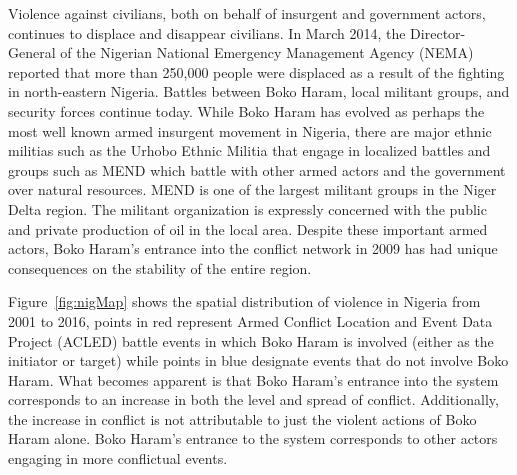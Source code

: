 Violence against civilians, both on behalf of insurgent and government actors, continues to displace and disappear civilians.  In March 2014, the Director-General of the Nigerian National Emergency Management Agency (NEMA) reported that more than 250,000 people were displaced as a result of the fighting in north-eastern Nigeria. Battles between Boko Haram, local militant groups, and security forces continue today. While Boko Haram has evolved as perhaps the most well known armed insurgent movement in Nigeria, there are major ethnic militias such as the Urhobo Ethnic Militia that engage in localized battles and groups such as MEND which battle with other armed actors and the government over natural resources. MEND is one of the largest militant groups in the Niger Delta region. The militant organization is expressly concerned with the public and private production of oil in the local area. Despite these important armed actors, Boko Haram's entrance into the conflict network in 2009 has had unique consequences on the stability of the entire region.

Figure~\ref{fig:nigMap} shows the spatial distribution of violence in Nigeria from 2001 to 2016, points in red represent Armed Conflict Location and Event Data Project (ACLED) battle events in which Boko Haram is involved (either as the initiator or target) while points in blue designate events that do not involve Boko Haram. What becomes apparent is that Boko Haram's entrance into the system corresponds to an increase in both the level and spread of conflict. Additionally, the increase in conflict is not attributable to just the violent actions of Boko Haram alone. Boko Haram's entrance to the system corresponds to other actors engaging in more conflictual events. 
